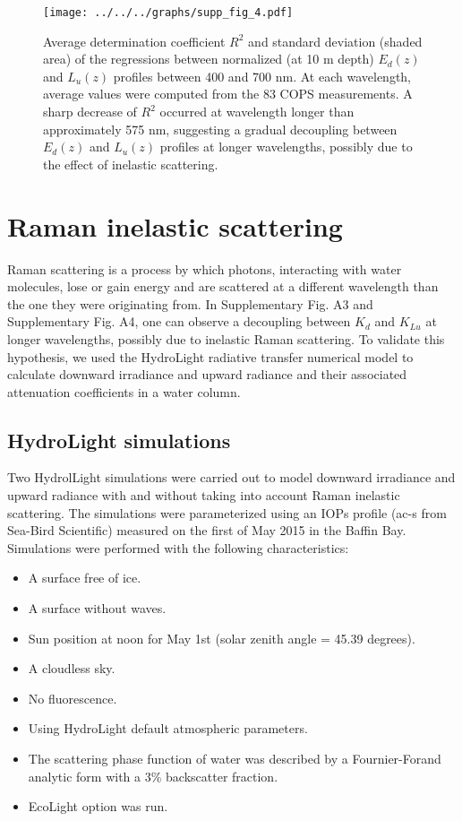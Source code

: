 \documentclass[10pt]{article}
\newcommand{\ked}{\ensuremath{K_{d}}}
\newcommand{\klu}{\ensuremath{K_{Lu}}}
\newcommand{\edz}{\ensuremath{{E_d(z)}}}
\newcommand{\luz}{\ensuremath{{L_u(z)}}}
\begin{document}
\begin{figure}[H]
	\centering
	\texttt{[image: ../../../graphs/supp\_fig\_4.pdf]}
	\caption{Average determination coefficient \(R^2\) and standard deviation (shaded area) of the regressions between normalized (at 10 m depth) \edz{} and \luz{} profiles between 400 and 700 nm. At each wavelength, average values were computed from the 83 COPS measurements. A sharp decrease of \(R^2\) occurred at wavelength longer than approximately 575 nm, suggesting a gradual decoupling between \edz{} and \luz{} profiles at longer wavelengths, possibly due to the effect of inelastic scattering.}
\end{figure}

\clearpage
\section{Raman inelastic scattering}

Raman scattering is a process by which photons, interacting with water molecules, lose or gain energy and are scattered at a different wavelength than the one they were originating from. In Supplementary Fig. A3 and Supplementary Fig. A4, one can observe a decoupling between \ked{} and \klu{} at longer wavelengths, possibly due to inelastic Raman scattering. To validate this hypothesis, we used the HydroLight radiative transfer numerical model to calculate downward irradiance and upward radiance and their associated attenuation coefficients in a water column.

\subsection{HydroLight simulations}

Two HydrolLight simulations were carried out to model downward irradiance and upward radiance with and without taking into account Raman inelastic scattering. The simulations were parameterized using an IOPs profile (ac-s from Sea-Bird Scientific) measured on the first of May 2015 in the Baffin Bay. Simulations were performed with the following characteristics:

\begin{itemize}
	\item A surface free of ice.
	\item A surface without waves.
	\item Sun position at noon for May 1st (solar zenith angle = 45.39 degrees).
	\item A cloudless sky.
	\item No fluorescence.
	\item Using HydroLight default atmospheric parameters.
	\item The scattering phase function of water was described by a Fournier-Forand analytic form with a 3\% backscatter fraction.
	\item EcoLight option was run.
\end{itemize}
\end{document}
